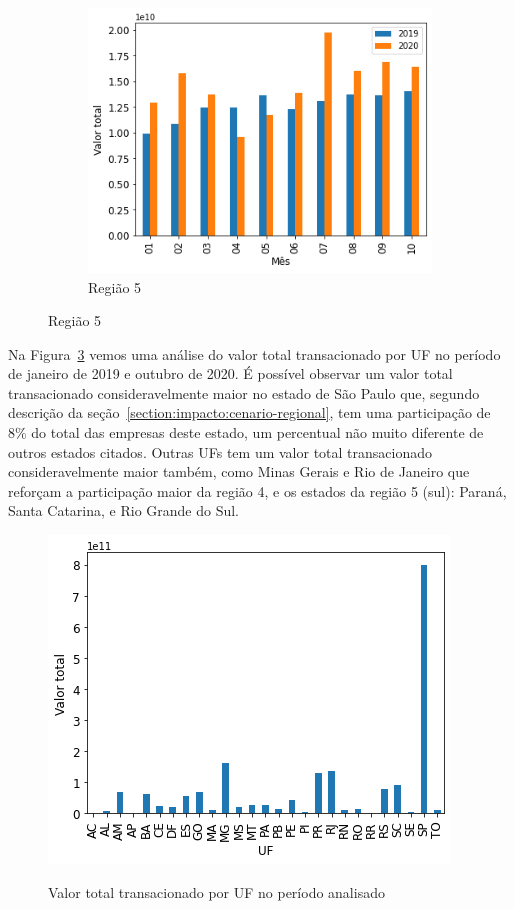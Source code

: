 \begin{figure}[htb]
\begin{subfigure}[b]{0.45\textwidth}
        \includegraphics[scale=0.45]{images/base-de-dados-13.5-comparacao-valor-total-por-regiao.png}
        \caption{Região 5}
        \label{fig:pandemia:base-de-dados-13.5-comparacao-valor-total-por-regiao}
    \end{subfigure}
    \fdadospesquisa
\end{figure}

Na Figura~\ref{fig:pandemia:base-de-dados-14.1-valor-total-por-uf} vemos uma análise do valor total transacionado por UF no período de janeiro de 2019 e outubro de 2020. É possível observar um valor total transacionado consideravelmente maior no estado de São Paulo que, segundo descrição da seção~\ref{section:impacto:cenario-regional}, tem uma participação de 8\% do total das empresas deste estado, um percentual não muito diferente de outros estados citados. Outras UFs tem um valor total transacionado consideravelmente maior também, como Minas Gerais e Rio de Janeiro que reforçam a participação maior da região 4, e os estados da região 5 (sul): Paraná, Santa Catarina, e Rio Grande do Sul.

\begin{figure}[htb]
	\centering
    \caption{Valor total transacionado por UF no período analisado}
    \includegraphics[scale=0.7]{images/base-de-dados-14.1-valor-total-por-uf.png}
    \label{fig:pandemia:base-de-dados-14.1-valor-total-por-uf}
    \fdadospesquisa
\end{figure}

